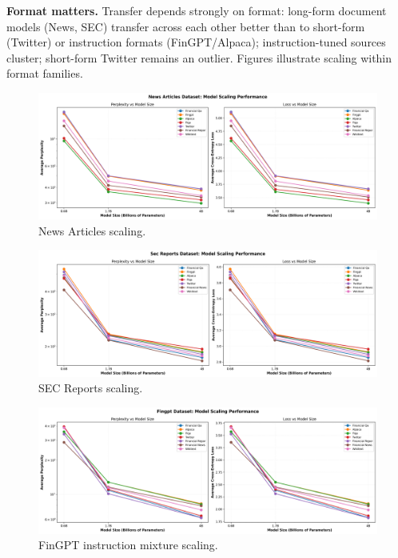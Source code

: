 \textbf{Format matters.} Transfer depends strongly on format: long-form document models (News, SEC) transfer across each other better than to short-form (Twitter) or instruction formats (FinGPT/Alpaca); instruction-tuned sources cluster; short-form Twitter remains an outlier. Figures  illustrate scaling within format families.

\begin{figure}[H]
  \centering
  \includegraphics[width=\textwidth]{../thesis/figures/scaling_news_articles.png}
  \caption{News Articles scaling.}\label{fig:scaling_news_articles}
\end{figure}

\begin{figure}[H]
  \centering
  \includegraphics[width=\textwidth]{../thesis/figures/scaling_sec_reports.png}
  \caption{SEC Reports scaling.}\label{fig:scaling_sec_reports}
\end{figure}

\begin{figure}[H]
  \centering
  \includegraphics[width=\textwidth]{../thesis/figures/scaling_fingpt.png}
  \caption{FinGPT instruction mixture scaling.}\label{fig:scaling_fingpt}
\end{figure}

